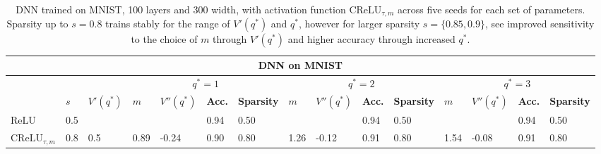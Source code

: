 \documentclass{article}
\theoremstyle{plain}
\theoremstyle{definition}
\theoremstyle{remark}
\begin{document}
\begin{table}[ht!]
\centering
\tiny
\caption{DNN trained on MNIST, 100 layers and 300 width, with activation function $\text{CReLU}_{\tau, m}$ across five seeds for each set of parameters. Sparsity up to $s=0.8$ trains stably for the range of $V'(q^*)$ and $q^*$, however for larger sparsity $s=\{0.85, 0.9\}$, see improved sensitivity to the choice of $m$ through $V'(q^*)$ and higher accuracy through increased $q^*$. }
\begin{tabular}
{p{0.75cm}p{0.3cm}p{0.6cm}|p{0.3cm}p{0.65cm}|p{0.4cm}p{0.6cm}|p{0.3cm}p{0.65cm}|p{0.4cm}p{0.6cm}|p{0.3cm}p{0.65cm}|p{0.4cm}p{0.6cm}}
\toprule
\multicolumn{15}{c}{\textbf{DNN on MNIST}} \\ 
\midrule
 &   & & \multicolumn{4}{|c|}{$q^*=1$} & \multicolumn{4}{|c|}{$q^*=2$} & \multicolumn{4}{|c}{$q^*=3$} \\
\midrule
  & $s$ & $V'(q^*)$  & 
 $m$ & $V''(q^*)$  &\textbf{Acc.} & \textbf{Sparsity} & $m$ & $V''(q^*)$ &\textbf{Acc.} & \textbf{Sparsity} & $m$ & $V''(q^*)$ &\textbf{Acc.} & \textbf{Sparsity} \\ 
\midrule
\multirow{1}{*}{$\text{ReLU}$}  &0.5& &&& 0.94& 0.50&&&0.94&0.50&&&0.94&0.50\\
\midrule
 \multirow{7}{*}{$\text{CReLU}_{\tau, m}$} 
&0.8& 0.5 &0.89&-0.24& 0.90 & 0.80 & 1.26 & -0.12& 0.91 & 0.80 &1.54&-0.08 & 0.91 & 0.80 \\

\end{tabular}
\end{table}
\end{document}
